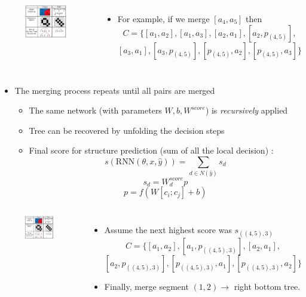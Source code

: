 \documentclass{beamer}
\begin{document}
\frame
{
	\begin{columns}
	\begin{figure}[ht]  
		\begin{center}
			\includegraphics[width=2.in]{images/fig3.png}   
		\end{center}   
	\end{figure}
	\begin{itemize}
		\item For example, if we merge $[a_4, a_5]$ then 
		$$ C = \{[a_1, a_2], [a_1, a_3], [a_2, a_1], [a_2, p_{(4,5)}], $$
		$$ [a_3, a_1], [a_3, p_{(4,5)}], [p_{(4,5)}, a_2], [p_{(4,5)}, a_3]\} $$
	\end{itemize}
	\end{columns}
}
\frame
{
	\begin{itemize}
		\item The merging process repeats until all pairs are merged
		\begin{itemize}
		\item The same network (with parameters $W, b, W^{score}$) is \emph{recursively} applied
		\item Tree can be recovered by unfolding the decision steps
		\item Final score for structure prediction (sum of all the local decision) :
		$$ s(\text{RNN}(\theta, x, \hat{y})) = \sum_{d\in N(\hat{y})} s_d  $$ 
		$$ s_d = W^{score}_d p $$ 
		$$ p = f(W[c_i;c_j] + b) $$
		\end{itemize}
	\end{itemize}
}
\frame
{
	\begin{columns}
	\column{0.45\textwidth}
	\begin{figure}[ht]  
		\begin{center}
			\includegraphics[width=2.in]{images/fig3.png}   
		\end{center}   
	\end{figure}
	\column{0.73\textwidth} 
	\begin{itemize}
		\item Assume the next highest score was $s_{((4,5),3)}$
		$$ C = \{[a_1, a_2], [a_1, p_{((4,5), 3)}], [a_2, a_1], $$
		$$ [a_2, p_{((4,5), 3)}], [p_{((4,5), 3)}, a_1], [p_{((4,5), 3)}, a_2]\} $$
		\item Finally, merge segment $(1,2) \rightarrow$ right bottom tree. 
	\end{itemize}
	\end{columns}
}
\end{document}
